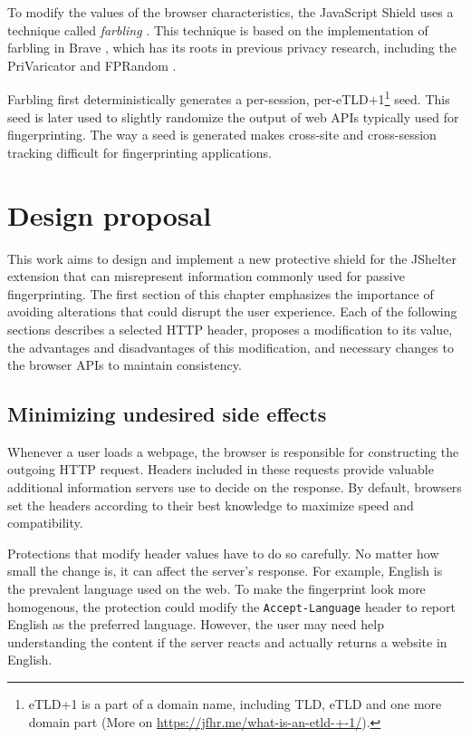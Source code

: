 To modify the values of the browser characteristics, the JavaScript Shield uses a technique called \emph{farbling} \cite{JShelterPaper}. This technique is based on the implementation of farbling in Brave \cite{BraveFingerprintingDefences2}, which has its roots in previous privacy research, including the PriVaricator \cite{PriVaricator} and FPRandom \cite{FPRandom}.

Farbling first deterministically generates a per-session, per-eTLD+1\footnote{eTLD+1 is a part of a domain name, including TLD, eTLD and one more domain part (More on \url{https://jfhr.me/what-is-an-etld-+-1/}).} seed. This seed is later used to slightly randomize the output of web APIs typically used for fingerprinting. The way a seed is generated makes cross-site and cross-session tracking difficult for fingerprinting applications.


\chapter{Design proposal}
\label{Chapter:Design}


This work aims to design and implement a new protective shield for the JShelter extension that can misrepresent information commonly used for passive fingerprinting. The first section of this chapter emphasizes the importance of avoiding alterations that could disrupt the user experience. Each of the following sections describes a selected HTTP header, proposes a modification to its value, the advantages and disadvantages of this modification, and necessary changes to the browser APIs to maintain consistency.

\section{Minimizing undesired side effects}

Whenever a user loads a webpage, the browser is responsible for constructing the outgoing HTTP request. Headers included in these requests provide valuable additional information servers use to decide on the response. By default, browsers set the headers according to their best knowledge to maximize speed and compatibility.

Protections that modify header values have to do so carefully. No matter how small the change is, it can affect the server's response. For example, English is the prevalent language used on the web. To make the fingerprint look more homogenous, the protection could modify the \texttt{Accept-Language} header to report English as the preferred language. However, the user may need help understanding the content if the server reacts and actually returns a website in English.

